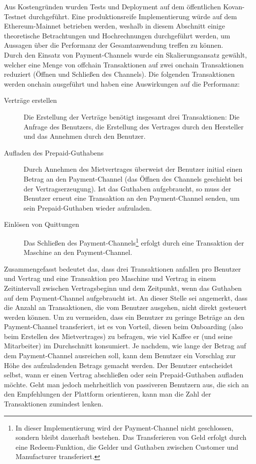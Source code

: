 Aus Kostengründen wurden Tests und Deployment auf dem öffentlichen Kovan-Testnet durchgeführt. Eine produktionsreife Implementierung würde auf dem Ethereum-Mainnet betrieben werden, weshalb in diesem Abschnitt einige theoretische Betrachtungen und Hochrechnungen durchgeführt werden, um Aussagen über die Performanz der Gesamtanwendung treffen zu können.\\
Durch den Einsatz von Payment-Channels wurde ein Skalierungsansatz gewählt, welcher eine Menge von offchain Transaktionen auf zwei onchain Transaktionen reduziert (Öffnen und Schließen des Channels). Die folgenden Transaktionen werden onchain ausgeführt und haben eine Auswirkungen auf die Performanz:
\begin{description}
  \item[Verträge erstellen] Die Erstellung der Verträge benötigt insgesamt drei Transaktionen: Die Anfrage des Benutzers, die Erstellung des Vertrages durch den Hersteller und das Annehmen durch den Benutzer.
  \item[Aufladen des Prepaid-Guthabens] Durch Annehmen des Mietvertrages überweist der Benutzer initial einen Betrag an den Payment-Channel (das Öffnen des Channels geschieht bei der Vertragserzeugung). Ist das Guthaben aufgebraucht, so muss der Benutzer erneut eine Transaktion an den Payment-Channel senden, um sein Prepaid-Guthaben wieder aufzuladen.
  \item[Einlösen von Quittungen] Das Schließen des Payment-Channels\footnote{In dieser Implementierung wird der Payment-Channel nicht geschlossen, sondern bleibt dauerhaft bestehen. Das Transferieren von Geld erfolgt durch eine Redeem-Funktion, die Gelder und Guthaben zwischen Customer und Manufacturer transferiert.} erfolgt durch eine Transaktion der Maschine an den Payment-Channel.\\
\end{description}
Zusammengefasst bedeutet das, dass drei Transaktionen anfallen pro Benutzer und Vertrag und eine Transaktion pro Maschine und Vertrag in einem Zeitintervall zwischen Vertragsbeginn und dem Zeitpunkt, wenn das Guthaben auf dem Payment-Channel aufgebraucht ist. An dieser Stelle sei angemerkt, dass die Anzahl an Transaktionen, die vom Benutzer ausgehen, nicht direkt gesteuert werden können. Um zu vermeiden, dass ein Benutzer zu geringe Beträge an den Payment-Channel transferiert, ist es von Vorteil, diesen beim Onboarding (also beim Erstellen des Mietvertrages) zu befragen, wie viel Kaffee er (und seine Mitarbeiter) im Durchschnitt konsumiert. Je nachdem, wie lange der Betrag auf dem Payment-Channel ausreichen soll, kann dem Benutzer ein Vorschlag zur Höhe des aufzuladenden Betrags gemacht werden. Der Benutzer entscheidet selbst, wann er einen Vertrag abschließen oder sein Prepaid-Guthaben aufladen möchte. Geht man jedoch mehrheitlich von passiveren Benutzern aus, die sich an den Empfehlungen der Plattform orientieren, kann man die Zahl der Transaktionen zumindest lenken.\\
